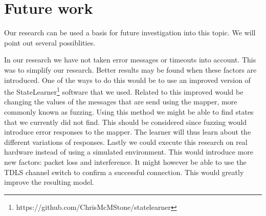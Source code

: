 \chapter{Future work}
\label{futurework}

Our research can be used a basis for future investigation into this topic. We will point out several possiblities.

In our research we have not taken error messages or timeouts into account. This was to simplify our research. Better results may be found when these factors are introduced. One of the ways to do this would be to use an improved version of the StateLearner\footnote{https://github.com/ChrisMcMStone/statelearner} software that we used. 
Related to this improved would be changing the values of the messages that are send using the mapper, more commonly known as fuzzing. Using this method we might be able to find states that we currently did not find. This should be considered since fuzzing would introduce error responses to the mapper. The learner will thus learn about the different variations of responses.
Lastly we could execute this research on real hardware instead of using a simulated environment. This would introduce more new factors: packet loss and interference. It might however be able to use the TDLS channel switch to confirm a successful connection. This would greatly improve the resulting model.